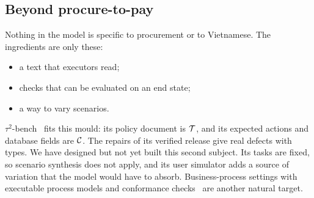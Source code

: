 \subsection{Beyond procure-to-pay}

Nothing in the model is specific to procurement or to Vietnamese. The ingredients are only these:
\begin{itemize}[leftmargin=*]
\item a text that executors read;
\item checks that can be evaluated on an end state;
\item a way to vary scenarios.
\end{itemize}
$\tau^2$-bench~\cite{barres2026bench} fits this mould: its policy document is $\mathcal{T}$, and its expected actions and database fields are $\mathcal{C}$. The repairs of its verified release give real defects with types. We have designed but not yet built this second subject. Its tasks are fixed, so scenario synthesis does not apply, and its user simulator adds a source of variation that the model would have to absorb. Business-process settings with executable process models and conformance checks~\cite{fahland2015model,calvanese2026agentic} are another natural target.
